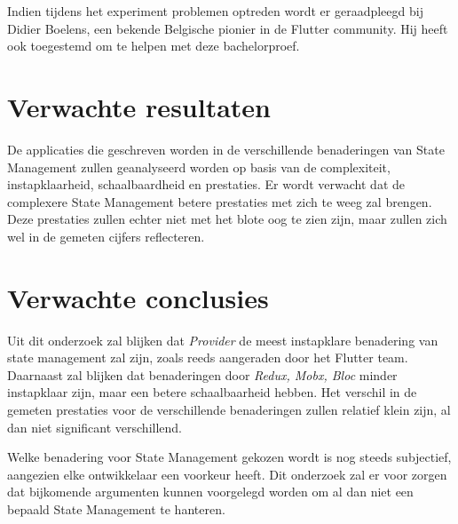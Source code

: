 Indien tijdens het experiment problemen optreden wordt er geraadpleegd bij Didier Boelens,
een bekende Belgische pionier in de Flutter community. Hij heeft ook toegestemd om te helpen met deze bachelorproef.

%

\section{Verwachte resultaten}
\label{sec:verwachte_resultaten}

De applicaties die geschreven worden in de verschillende benaderingen van State Management zullen
geanalyseerd worden op basis van de complexiteit, instapklaarheid, schaalbaardheid en prestaties.
Er wordt verwacht dat de complexere State Management betere prestaties met zich te weeg zal brengen.
Deze prestaties zullen echter niet met het blote oog te zien zijn, maar zullen zich wel in de 
gemeten cijfers reflecteren.


\section{Verwachte conclusies}
\label{sec:verwachte_conclusies}
Uit dit onderzoek zal blijken dat \emph{Provider} de meest instapklare benadering van state management
zal zijn, zoals reeds aangeraden door het Flutter team.
Daarnaast zal blijken dat benaderingen door \emph{Redux, Mobx, Bloc} minder instapklaar zijn, maar een 
betere schaalbaarheid hebben.
Het verschil in de gemeten prestaties voor de verschillende benaderingen zullen relatief klein zijn, al dan niet significant verschillend.

Welke benadering voor State Management gekozen wordt is nog steeds subjectief, aangezien elke ontwikkelaar een voorkeur heeft. Dit onderzoek zal er voor zorgen
dat bijkomende argumenten kunnen voorgelegd worden om al dan niet een bepaald State Management te hanteren.



